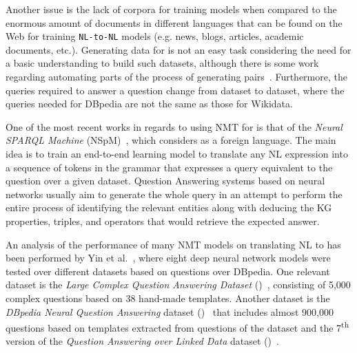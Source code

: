 Another issue is the lack of corpora for training \NLtoSPARQL{} models when compared to 
the enormous amount of documents in different languages that can be found on the Web for 
training \texttt{NL-to-NL} models (e.g. news, blogs, articles, academic documents, etc.). Generating 
data for \NLtoSPARQL{} is not an easy task considering the need for a basic \SPARQL{} understanding 
to build such datasets, although there is some work regarding automating parts 
of the process of generating \NLtoSPARQL{} pairs~\cite{dataset:dbnqa-hartmann-marx-soru-2018, 
dataset:lcquad-TrivediMDL17}. Furthermore, the queries required to answer a question change from 
dataset to dataset, where the \SPARQL{} queries needed for DBpedia are not the same as those for Wikidata.

One of the most recent works in regards to using NMT for \SPARQL{} is that of 
the \textit{Neural SPARQL Machine} (NSpM)~\cite{nmt:nspm-SoruMMPVEN17}, which considers \SPARQL{} as a foreign 
language. The main idea is to train an end-to-end learning model to translate any NL expression 
into a sequence of tokens in the \SPARQL{} grammar that expresses a query equivalent to the 
question over a given dataset. Question Answering systems based on neural networks usually 
aim to generate the whole \SPARQL{} query in an attempt to perform the entire process of 
identifying the relevant entities along with deducing the KG properties, triples, and operators 
that would retrieve the expected answer. 

An analysis of the performance of many NMT models on translating NL to \SPARQL{} 
has been performed by Yin et al.~\cite{nmt:nl-to-sparql-Yin19}, where eight deep neural network models 
were tested over different datasets based on questions over DBpedia. One relevant dataset is the 
\textit{Large Complex Question Answering Dataset} (\LCQuADone)~\cite{dataset:lcquad-TrivediMDL17}, 
consisting of 5,000 complex questions based on 38 hand-made templates. Another dataset is the 
\textit{DBpedia Neural Question Answering} dataset (\DBNQA)~\cite{dataset:dbnqa-hartmann-marx-soru-2018} 
that includes almost 900,000 questions based on templates extracted from questions of the \LCQuADone{} 
dataset and the 7\textsuperscript{th} version of the \textit{Question Answering over Linked Data} 
dataset (\QALDseven)~\cite{dataset:qald7-UsbeckNHKRN17}.

